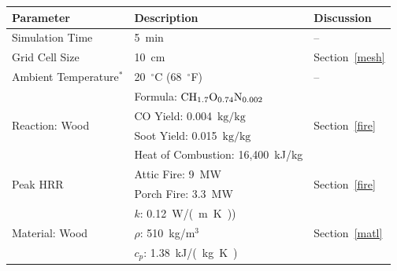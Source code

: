 \begin{table}[h!]
\centering
{}\label{tab:mod_param}
\begin{tabular}{lll}
\toprule[1.5pt]
Parameter                                                  & Description                                   & Discussion                            \\
\midrule
Simulation Time                                            &  5~min                                        & --                                    \\ [.25cm]
Grid Cell Size                                             &  10~cm                                        & Section~\ref{mesh}                    \\ [.25cm]
Ambient Temperature$^*$                                    &  20~$^{\circ}$C (68~$^{\circ}$F)              & --                                    \\ [.1cm]
\multirow{4}{*}{Reaction: Wood~\cite{SFPE:Tewarson}}       &  Formula: $\mbox{C}\mbox{H}_{1.7}\mbox{O}_{0.74}\mbox{N}_{0.002}$     & \multirow{4}{*}{Section~\ref{fire}}   \\
                                                           &  CO Yield: 0.004~$\mathrm{kg}/\mathrm{kg}$    &                                       \\
                                                           &  Soot Yield: 0.015~$\mathrm{kg}/\mathrm{kg}$  &                                       \\
                                                           &  Heat of Combustion: 16,400~kJ/kg             &                                       \\ [.25cm]
\multirow{2}{*}{Peak HRR}                                  &  Attic Fire: 9~MW                             & \multirow{2}{*}{Section~\ref{fire}}   \\ 
                                                           &  Porch Fire: 3.3~MW                           &                                       \\ [.25cm]                     
\multirow{3}{*}{Material: Wood~\cite{Incropera:1} }        &  $k$: 0.12~\si{W/(m.K)})                      & \multirow{3}{*}{Section~\ref{matl}}   \\
                                                           &  $\rho$: 510~kg/m$^3$                         &                                       \\
                                                           &  $c_{p}$: 1.38~\si{kJ/(kg.K)}                 &                                       \\ [.25cm]

\end{tabular}
\end{table}
